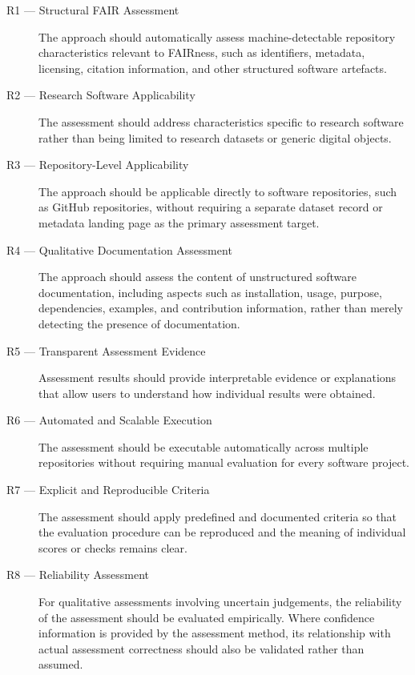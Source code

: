\begin{description}

\item[R1 --- Structural FAIR Assessment]
The approach should automatically assess machine-detectable
repository characteristics relevant to FAIRness, such as identifiers,
metadata, licensing, citation information, and other structured
software artefacts.

\item[R2 --- Research Software Applicability]
The assessment should address characteristics specific to research
software rather than being limited to research datasets or generic
digital objects.

\item[R3 --- Repository-Level Applicability]
The approach should be applicable directly to software repositories,
such as GitHub repositories, without requiring a separate dataset
record or metadata landing page as the primary assessment target.

\item[R4 --- Qualitative Documentation Assessment]
The approach should assess the content of unstructured software
documentation, including aspects such as installation, usage,
purpose, dependencies, examples, and contribution information,
rather than merely detecting the presence of documentation.

\item[R5 --- Transparent Assessment Evidence]
Assessment results should provide interpretable evidence or
explanations that allow users to understand how individual results
were obtained.

\item[R6 --- Automated and Scalable Execution]
The assessment should be executable automatically across multiple
repositories without requiring manual evaluation for every software
project.

\item[R7 --- Explicit and Reproducible Criteria]
The assessment should apply predefined and documented criteria so
that the evaluation procedure can be reproduced and the meaning of
individual scores or checks remains clear.

\item[R8 --- Reliability Assessment]
For qualitative assessments involving uncertain judgements, the
reliability of the assessment should be evaluated empirically.
Where confidence information is provided by the assessment method,
its relationship with actual assessment correctness should also be
validated rather than assumed.

\end{description}

